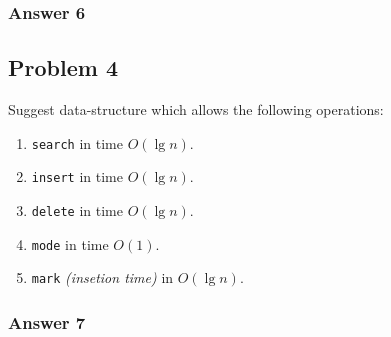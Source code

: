 \documentclass[11pt]{article}
\begin{document}
\subsubsection{Answer 6}
\label{sec-1-3-1}

\subsection{Problem 4}
\label{sec-1-4}
Suggest data-structure which allows the following operations:
\begin{enumerate}
\item \texttt{search} in time $O(\lg n)$.
\item \texttt{insert} in time $O(\lg n)$.
\item \texttt{delete} in time $O(\lg n)$.
\item \texttt{mode} in time $O(1)$.
\item \texttt{mark} \emph{(insetion time)} in $O(\lg n)$.
\end{enumerate}

\subsubsection{Answer 7}
\label{sec-1-4-1}
\end{document}
